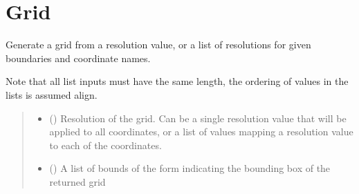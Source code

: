 \documentclass[letterpaper,10pt,english]{sphinxmanual}
\begin{document}
\section{Grid}
\label{\detokenize{covariance:grid}}

\begin{fulllineitems}
\label{\detokenize{covariance:glomar_gridding.grid.grid_from_resolution}}
\pysigstartsignatures
\pysiglinewithargsret
{}
{\sphinxparamcomma {}\sphinxparamcomma {}}
{}
\pysigstopsignatures
\sphinxAtStartPar
Generate a grid from a resolution value, or a list of resolutions for
given boundaries and coordinate names.

\sphinxAtStartPar
Note that all list inputs must have the same length, the ordering of values
in the lists is assumed align.
\begin{quote}\begin{description}
\begin{itemize}
\item {}
\sphinxAtStartPar
{} (\sphinxstyleliteralemphasis{\sphinxupquote{ | }}\sphinxstyleliteralemphasis{\sphinxupquote{{[}}}\sphinxstyleliteralemphasis{\sphinxupquote{{]}}}) \textendash{} Resolution of the grid. Can be a single resolution value that will be
applied to all coordinates, or a list of values mapping a resolution
value to each of the coordinates.

\item {}
\sphinxAtStartPar
{} (\sphinxstyleliteralemphasis{\sphinxupquote{{[}}}\sphinxstyleliteralemphasis{\sphinxupquote{{[}}}\sphinxstyleliteralemphasis{\sphinxupquote{, }}\sphinxstyleliteralemphasis{\sphinxupquote{{]}}}\sphinxstyleliteralemphasis{\sphinxupquote{{]}}}) \textendash{} A list of bounds of the form  indicating
the bounding box of the returned grid


\end{itemize}
\end{description}
\end{quote}
\end{fulllineitems}
\end{document}
